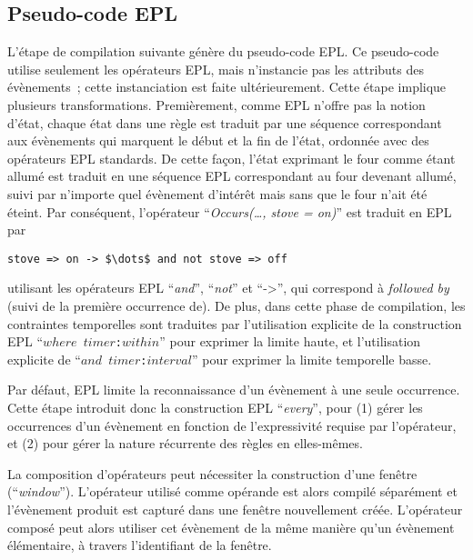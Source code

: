 \subsection{Pseudo-code EPL}
L'étape de compilation suivante génère du pseudo-code EPL. Ce pseudo-code 
utilise seulement les opérateurs EPL, mais n'instancie pas les attributs des 
évènements~; cette instanciation est faite ultérieurement. Cette étape implique 
plusieurs transformations. Premièrement, comme EPL n'offre pas la notion d'état, 
chaque état dans une règle est traduit par une séquence correspondant aux 
évènements qui marquent le début et la fin de l'état, ordonnée avec des opérateurs 
EPL standards. De cette façon, l'état exprimant le four comme étant allumé est 
traduit en une séquence EPL correspondant au four devenant allumé, suivi par 
n'importe quel évènement d'intérêt mais sans que le four n'ait été éteint. 
Par conséquent, l'opérateur ``{\em Occurs(\dots, stove = on)}'' est traduit en EPL par 
\begin{lstlisting}[language=EPLPseudoCode,frame=none]
stove => on -> $\dots$ and not stove => off
\end{lstlisting}
\noindent 
utilisant les opérateurs EPL ``{\em and}'', ``{\em not}'' et ``->'', 
qui correspond à {\em followed by} (suivi de la première occurrence de). De plus, 
dans cette phase de compilation, les contraintes temporelles sont traduites par 
l'utilisation explicite de la construction EPL ``{\tt $where$ $timer$:$within$}'' pour 
exprimer la limite haute, et l'utilisation explicite de ``{\tt $and$ $timer$:$interval$}'' 
pour exprimer la limite temporelle basse. 



Par défaut, EPL limite la reconnaissance d'un évènement à une seule occurrence. 
Cette étape introduit donc la construction EPL ``{\em every}'', 
pour (1) gérer les occurrences d'un évènement en fonction de l'expressivité requise 
par l'opérateur, et (2) pour gérer la nature récurrente des règles en elles-mêmes.

La composition d'opérateurs peut nécessiter la construction d'une fenêtre (``{\em window}''). 
L'opérateur utilisé comme opérande est alors compilé séparément et l'évènement produit est capturé dans une
fenêtre nouvellement créée. 
L'opérateur composé peut alors utiliser cet évènement de la même manière qu'un évènement élémentaire,
à travers l'identifiant de la fenêtre.

